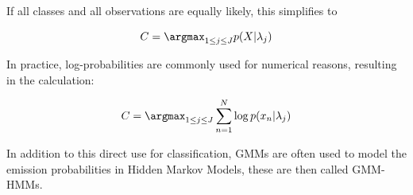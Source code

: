    
    If all classes and all observations are equally likely, this simplifies to

    \begin{equation}
        C = \argmax_{1 \leq j \leq J } p(X | \lambda_j) 
    \end{equation}

    In practice, log-probabilities are commonly used for numerical reasons, resulting in the calculation:

    \begin{equation}
        C = \argmax_{1 \leq j \leq J} \sum_{n=1}^N \log p(x_n | \lambda_j)
    \end{equation}

    In addition to this direct use for classification, GMMs are often used to model the emission probabilities in Hidden Markov Models, these are then called GMM-HMMs.